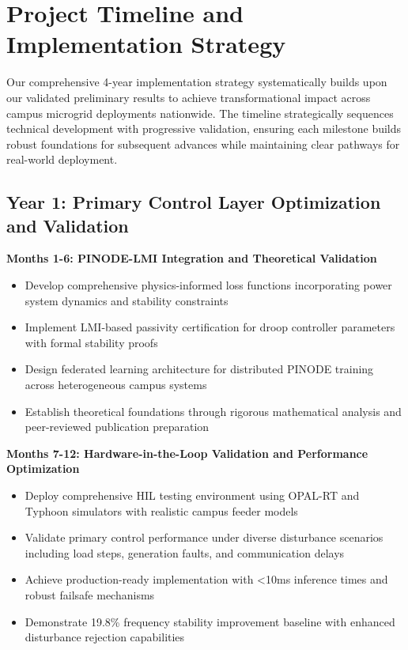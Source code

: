 \documentclass[12pt]{article}
\begin{document}
\section{Project Timeline and Implementation Strategy}

Our comprehensive 4-year implementation strategy systematically builds upon our validated preliminary results to achieve transformational impact across campus microgrid deployments nationwide. The timeline strategically sequences technical development with progressive validation, ensuring each milestone builds robust foundations for subsequent advances while maintaining clear pathways for real-world deployment.

\subsection{Year 1: Primary Control Layer Optimization and Validation}

\textbf{Months 1-6: PINODE-LMI Integration and Theoretical Validation}
\begin{itemize}
\item Develop comprehensive physics-informed loss functions incorporating power system dynamics and stability constraints
\item Implement LMI-based passivity certification for droop controller parameters with formal stability proofs
\item Design federated learning architecture for distributed PINODE training across heterogeneous campus systems
\item Establish theoretical foundations through rigorous mathematical analysis and peer-reviewed publication preparation
\end{itemize}

\textbf{Months 7-12: Hardware-in-the-Loop Validation and Performance Optimization}
\begin{itemize}
\item Deploy comprehensive HIL testing environment using OPAL-RT and Typhoon simulators with realistic campus feeder models
\item Validate primary control performance under diverse disturbance scenarios including load steps, generation faults, and communication delays
\item Achieve production-ready implementation with <10ms inference times and robust failsafe mechanisms
\item Demonstrate 19.8\% frequency stability improvement baseline with enhanced disturbance rejection capabilities
\end{itemize}
\end{document}
